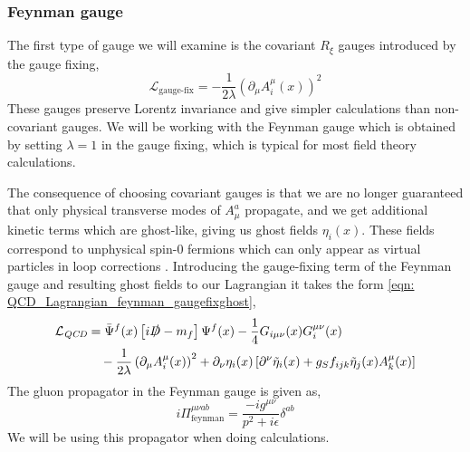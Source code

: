 \documentclass[main.tex]{subfiles}
\begin{document}
\subsubsection*{Feynman gauge}
The first type of gauge we will examine is the covariant \(R_\xi\) gauges introduced by the gauge fixing,
\begin{equation}\label{eqn: gauge_fixing_Rxi}
    \mathcal{L}_{\text{gauge-fix}} = -\frac{1}{2\lambda} \left(\partial_\mu A_i^\mu(x)\right)^2 
\end{equation}
These gauges preserve Lorentz invariance and give simpler calculations than non-covariant gauges. We will be working with the Feynman gauge which is obtained by setting \(\lambda =1\) in the gauge fixing, which is typical for most field theory calculations.

The consequence of choosing covariant gauges is that we are no longer guaranteed that only physical transverse modes of \(A_\mu^a\) propagate, and we get additional kinetic terms which are ghost-like, giving us ghost fields \(\eta_i(x)\). These fields correspond to unphysical spin-0 fermions which can only appear as virtual particles in loop corrections  \cite{schwartz2014quantum, mandl2010quantum}. Introducing the gauge-fixing term of the Feynman gauge and resulting ghost fields to our Lagrangian it takes the form \autoref{eqn: QCD_Lagrangian_feynman_gaugefixghost},
\begin{align}\label{eqn: QCD_Lagrangian_feynman_gaugefixghost}
    \begin{split}
    \mathcal{L}_{\textit{QCD}} &= \bar \Psi^f(x) \left[ i \slashed D -m_f\right] \Psi^f(x) - \frac{1}{4} G_{i\mu\nu}(x)G_{i}^{\mu\nu}(x) \\
    &\quad - \frac{1}{2\lambda} \left( \partial_\mu A_i^\mu(x)\right)^2 + \partial_\nu \eta_i(x) \left[\partial^\nu \tilde \eta_i(x)+g_S f_{ijk} \tilde\eta_j(x) A_k^\mu(x)\right]
    \end{split}
\end{align}
The gluon propagator in the Feynman gauge is given as,
\begin{equation}\label{eqn: gluon_propagator_feynman}
    i \Pi_{\text{feynman}}^{\mu\nu ab} = \frac{-i g^{\mu\nu}}{p^2+i\epsilon} \delta^{ab}
\end{equation}
We will be using this propagator when doing calculations. 
\end{document}
